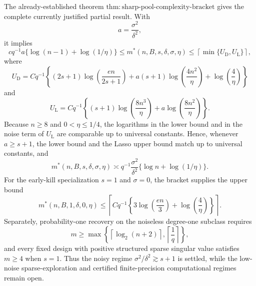 The already-established theorem \(\mathrm{thm{:}sharp\mbox{-}pool\mbox{-}complexity\mbox{-}bracket}\) gives the complete currently justified partial result.  With
\[
a=\frac{\sigma^2}{\delta^2},
\]
it implies
\[
cq^{-1}a\{\log(n-1)+\log(1/\eta)\}
\le m^*(n,B,s,\delta,\sigma,\eta)
\le \left\lceil\min\{U_{\mathrm D},U_{\mathrm L}\}\right\rceil,
\]
where
\[
U_{\mathrm D}=Cq^{-1}\left\{(2s+1)\log\!\left(\frac{en}{2s+1}\right)
+a(s+1)\log\!\left(\frac{4n^2}{\eta}\right)
+\log\!\left(\frac4\eta\right)\right\}
\]
and
\[
U_{\mathrm L}=Cq^{-1}\left\{(s+1)\log\!\left(\frac{8n^3}{\eta}\right)
+a\log\!\left(\frac{8n^2}{\eta}\right)\right\}.
\]
Because \(n\ge8\) and \(0<\eta\le1/4\), the logarithms in the lower bound and in the noise term of \(U_{\mathrm L}\) are comparable up to universal constants.  Hence, whenever \(a\ge s+1\), the lower bound and the Lasso upper bound match up to universal constants, and
\[
m^*(n,B,s,\delta,\sigma,\eta)
\asymp q^{-1}\frac{\sigma^2}{\delta^2}
\{\log n+\log(1/\eta)\}.
\]
For the early-kill specialization \(s=1\) and \(\sigma=0\), the bracket supplies the upper bound
\[
m^*(n,B,1,\delta,0,\eta)
\le
\left\lceil Cq^{-1}\left\{3\log\!\left(\frac{en}{3}\right)
+\log\!\left(\frac4\eta\right)\right\}\right\rceil.
\]
Separately, probability-one recovery on the noiseless degree-one subclass requires
\[
m\ge
\max\!\left\{\left\lceil\log_2(n+2)\right\rceil,
\left\lceil\frac1q\right\rceil\right\},
\]
and every fixed design with positive structured sparse singular value satisfies \(m\ge4\) when \(s=1\).  Thus the noisy regime \(\sigma^2/\delta^2\gtrsim s+1\) is settled, while the low-noise sparse-exploration and certified finite-precision computational regimes remain open.
